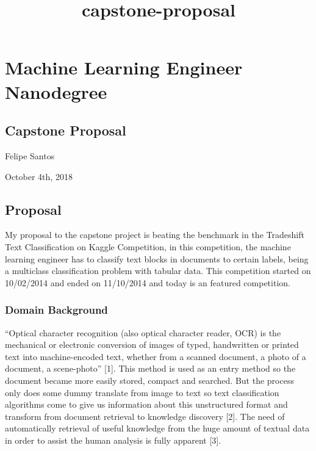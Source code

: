 \documentclass[11pt]{article}
\title{capstone-proposal}
\begin{document}
    
    
    \maketitle
    
    

    
    \hypertarget{machine-learning-engineer-nanodegree}{%
\section{Machine Learning Engineer
Nanodegree}\label{machine-learning-engineer-nanodegree}}

\hypertarget{capstone-proposal}{%
\subsection{Capstone Proposal}\label{capstone-proposal}}

Felipe Santos

October 4th, 2018

    \hypertarget{proposal}{%
\subsection{Proposal}\label{proposal}}

My proposal to the capstone project is beating the benchmark in the
Tradeshift Text Classification on Kaggle Competition, in this
competition, the machine learning engineer has to classify text blocks
in documents to certain labels, being a multiclass classification
problem with tabular data. This competition started on 10/02/2014 and
ended on 11/10/2014 and today is an featured competition.

\hypertarget{domain-background}{%
\subsubsection{Domain Background}\label{domain-background}}

``Optical character recognition (also optical character reader, OCR) is
the mechanical or electronic conversion of images of typed, handwritten
or printed text into machine-encoded text, whether from a scanned
document, a photo of a document, a scene-photo'' {[}1{]}. This method is
used as an entry method so the document became more easily stored,
compact and searched. But the process only does some dummy translate
from image to text so text classification algorithms come to give us
information about this unstructured format and transform from document
retrieval to knowledge discovery {[}2{]}. The need of automatically
retrieval of useful knowledge from the huge amount of textual data in
order to assist the human analysis is fully apparent {[}3{]}.
\end{document}
